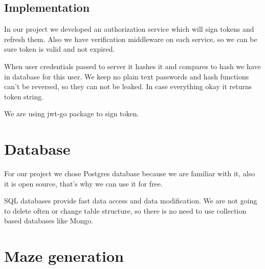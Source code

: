 	\subsection{Implementation}
	In our project we developed an authorization service which will sign tokens and refresh them. Also we have verification middleware on each service, so we can be sure token is valid and not expired.
	
		When user credentials passed to server it hashes it and compares to hash we have in database for this user. We keep no plain text passwords and hash functions can't be reversed, so they can not be leaked. In case everything okay it returns token string.
		
		We are using jwt-go package to sign token.
		
	
\section{Database}
	For our project we chose Postgres database because we are familiar with it, also it is open source, that's why we can use it for free.
	
	SQL databases provide fast data access and data modification. We are not going to delete often or change table structure, so there is no need to use collection based databases like Mongo.
	
\section{Maze generation}
	